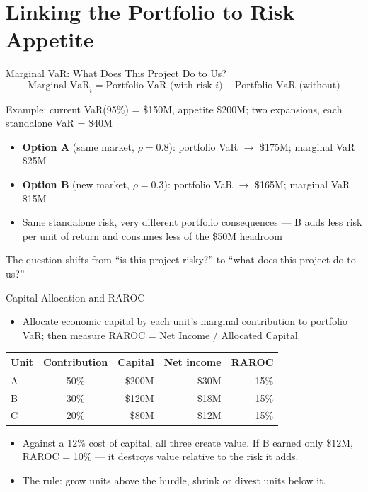 \documentclass[11pt, aspectratio=169]{beamer}
\begin{document}
\section{Linking the Portfolio to Risk Appetite}

\begin{frame}{Marginal VaR: What Does This Project Do to Us?}
\[
\text{Marginal VaR}_i = \text{Portfolio VaR (with risk } i\text{)} - \text{Portfolio VaR (without)}
\]
\begin{exampleblock}{Example: current VaR(95\%) = \$150M, appetite \$200M; two expansions, each standalone VaR = \$40M}
\begin{itemize}
  \item \textbf{Option A} (same market, $\rho = 0.8$): portfolio VaR $\to$ \$175M; marginal VaR \$25M
  \item \textbf{Option B} (new market, $\rho = 0.3$): portfolio VaR $\to$ \$165M; marginal VaR \$15M
  \item Same standalone risk, very different portfolio consequences --- B adds less risk per unit of return and consumes less of the \$50M headroom
\end{itemize}
\end{exampleblock}
\medskip
The question shifts from ``is this project risky?'' to \alert{``what does this project do to us?''}
\end{frame}

\begin{frame}{Capital Allocation and RAROC}
\begin{itemize}
  \item Allocate economic capital by each unit's marginal contribution to portfolio VaR; then measure \alert{RAROC} = Net Income / Allocated Capital.
\end{itemize}
\medskip
\begin{center}
\small
\begin{tabular}{lcrrr}
\toprule
\textbf{Unit} & \textbf{Contribution} & \textbf{Capital} & \textbf{Net income} & \textbf{RAROC} \\
\midrule
A & 50\% & \$200M & \$30M & 15\% \\
B & 30\% & \$120M & \$18M & 15\% \\
C & 20\% & \$80M  & \$12M & 15\% \\
\bottomrule
\end{tabular}
\end{center}
\medskip
\begin{itemize}
  \item Against a 12\% cost of capital, all three create value. If B earned only \$12M, RAROC = 10\% --- it destroys value relative to the risk it adds.
  \item The rule: grow units above the hurdle, shrink or divest units below it.
\end{itemize}
\end{frame}
\end{document}

